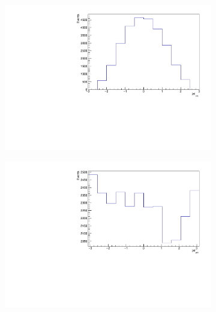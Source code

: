 \begin{figure}
  \begin{subfigure}{0.5\textwidth}
    \centering
    \includegraphics[width=\linewidth]{plots_and_txt/ttbar.mu_selected_/ttbar.mu_selected_jet_eta.pdf}
    \caption{}
    \label{fig:lep_pt4}
  \end{subfigure}%
  \begin{subfigure}{0.5\textwidth}
    \centering
    \includegraphics[width=\linewidth]{plots_and_txt/ttbar.mu_selected_/ttbar.mu_selected_jet_phi.pdf}
    \caption{}
    \label{fig:btagged4}
  \end{subfigure}%
  \newline
  \begin{subfigure}{0.5\textwidth}
    \centering

\end{subfigure}
\end{figure}
